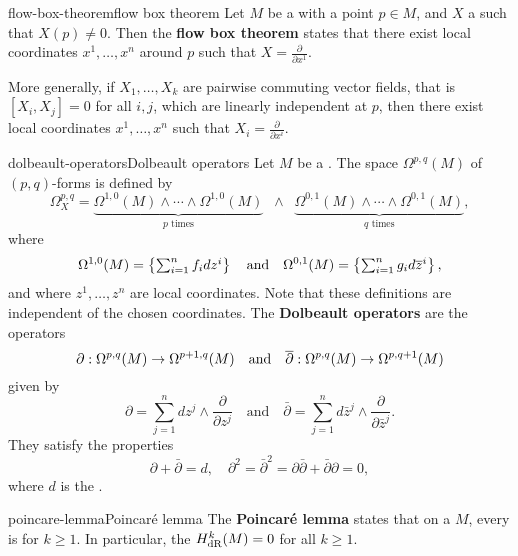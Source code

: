 \begin{topic}{flow-box-theorem}{flow box theorem}
    Let $M$ be a  with a point $p \in M$, and $X$ a  such that $X(p) \ne 0$. Then the \textbf{flow box theorem} states that there exist local coordinates $x^1, \ldots, x^n$ around $p$ such that $X = \frac{\partial}{\partial x^1}$.
    
    More generally, if $X_1, \ldots, X_k$ are pairwise commuting vector fields, that is $[X_i, X_j] = 0$ for all $i, j$, which are linearly independent at $p$, then there exist local coordinates $x^1, \ldots, x^n$ such that $X_i = \frac{\partial}{\partial x^i}$.
\end{topic}

\begin{topic}{dolbeault-operators}{Dolbeault operators}
    Let $M$ be a . The space $\Omega^{p, q}(M)$ of $(p, q)$-forms is defined by
    \[ \Omega_X^{p, q} = \underbrace{\Omega^{1,0}(M) \wedge \cdots \wedge \Omega^{1,0}(M)}_{\text{$p$ times}} \;\; \wedge \;\; \underbrace{\Omega^{0,1}(M) \wedge \cdots \wedge \Omega^{0,1}(M)}_{\text{$q$ times}} , \]
    where
    \[ \Omega^{1,0}(M) = \left\{ \textstyle\sum_{i = 1}^{n} f_i dz^i \right\} \quad \textup{and} \quad \Omega^{0,1}(M) = \left\{ \textstyle\sum_{i = 1}^{n} g_i d \overline{z}^i \right\} , \]
    and where $z^1, \ldots, z^n$ are local coordinates. Note that these definitions are independent of the chosen coordinates. The \textbf{Dolbeault operators} are the operators
    \[ \partial : \Omega^{p, q}(M) \to \Omega^{p + 1, q}(M) \quad \textup{and} \quad \overline{\partial} : \Omega^{p, q}(M) \to \Omega^{p, q + 1}(M) \]
    given by
    \[ \partial = \sum_{j = 1}^{n} dz^j \wedge \frac{\partial}{\partial z^j} \quad \text{and} \quad \bar{\partial} = \sum_{j = 1}^{n} d\bar{z}^j \wedge \frac{\partial}{\partial \bar{z}^j} . \]
    They satisfy the properties
    \[ \partial + \bar{\partial} = d, \quad \partial^2 = \bar{\partial}^2 = \partial \bar{\partial} + \bar{\partial} \partial = 0 , \]
    where $d$ is the .
\end{topic}

\begin{topic}{poincare-lemma}{Poincaré lemma}
    The \textbf{Poincaré lemma} states that on a   $M$, every  is  for $k \ge 1$. In particular, the  $H^k_\textup{dR}(M) = 0$ for all $k \ge 1$.
\end{topic}

